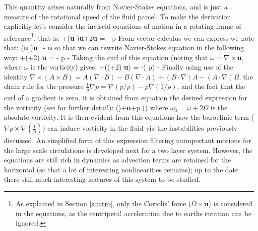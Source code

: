 This quantity arises naturally from Navier-Stokes equations, and is just a measure of the rotational speed of the fluid parcel. To make the derivation explicitly let's consider the inviscid equations of motion in a rotating frame of reference\footnote{As explained in Section \ref{s:intro}, only the Coriolis' force ($\Omega \times \textbf{u}$) is considered in the equations, as the centripetal acceleration due to earths rotation can be ignored.}, that is:
\beq
{}+(\textbf{u} \cdot \nabla)\textbf{u}+2\Omega \times \textbf{u} = - \nabla p
From vector calculus we can express we note that:
\beq
(\textbf{u} \cdot \nabla)\textbf{u}=- \textbf{u} \times \omega
{}
so that we can rewrite Navier-Stokes equation in the following way:
\beq
{}+(\omega+2\Omega) \times \textbf{u} = - \nabla p -
Taking the curl of this equation (noting that $\omega = \nabla \times \textbf{u}$, where $\omega$ is the vorticity) gives:
\beq
{}+\nabla (\times(\omega+2\Omega) \times \textbf{u}) = -\nabla \times\left( \nabla p\right) -\nabla \times {}
Finally using use of the identity $\nabla \times (A \times B) = A (\nabla \cdot B)-B (\nabla \cdot A)+(B \cdot \nabla)A-(A \cdot \nabla)B$, the chain rule for the pressure $\frac{1}{\rho} \nabla p = \nabla (p/\rho)-p \nabla (1/\rho)$, and the fact that the curl of a gradient is zero, it is obtained from equation  the desired expression for the vorticity (see  for further detail):
\beq
{}\left(\right)+ \textbf{u}+\nabla p \times \nabla \left(\right)
\ee
where $\omega_a=\omega+2\Omega$ is the absolute vorticity. It is then evident from this equations how the baroclinic term ($\nabla p \times \nabla \left(\frac{1}{\rho}\right)$) can induce vorticity in the fluid via the instabilities previously discussed. An simplified form of this expression filtering unimportant motions for the large scale circulations is developed next for a two layer system. However, the equations are still rich in dynamics as advection terms are retained for the horizontal (so that a lot of interesting nonlinearities remains); up to the date there still much interesting features of this system to be studied.






